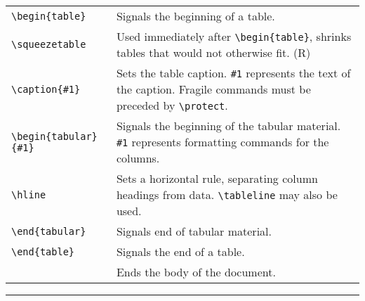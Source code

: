 \begin{quasitable}
\begin{tabular}{lp{4.5in}}
\verb+\begin{table}+  &
           Signals the beginning of a table.
                          \\[4pt]

\verb+\squeezetable+  &
           Used immediately after \verb+\begin{table}+, shrinks tables
                        that would not otherwise fit. (R)
                          \\[4pt]

\verb+\caption{#1}+  &
            Sets the table caption. \verb+#1+ represents the
                        text of the caption.
      Fragile commands must be preceded by \verb+\protect+.
        \\[4pt]

\verb+\begin{tabular}{#1}+  &
     Signals the beginning of the tabular material.  \verb+#1+
                        represents formatting commands for the columns.
                          \\[4pt]

\verb+\hline+  &
                  Sets a horizontal rule, separating column headings
                        from data. \verb+\tableline+ may also be used.
                          \\[4pt]

\verb+\end{tabular}+  &
           Signals end of tabular material.
                          \\[4pt]

\verb+\end{table}+  &
             Signals the end of a table.
                          \\[4pt]

\verb++  &
          Ends the body of the \REVTeX{} document.
                          \\[4pt]
\end{tabular}
\end{quasitable}





\smallskip\hrule


